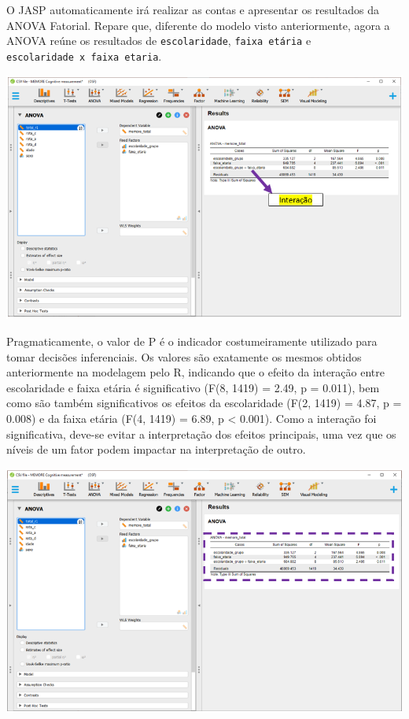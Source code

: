 \documentclass[
]{book}
\begin{document}
O JASP automaticamente irá realizar as contas e apresentar os resultados da ANOVA Fatorial. Repare que, diferente do modelo visto anteriormente, agora a ANOVA reúne os resultados de \texttt{escolaridade}, \texttt{faixa\ etária} e \texttt{escolaridade\ x\ faixa\ etaria}.

\includegraphics{./img/cap_anova_fatorial_resultados1.png}

Pragmaticamente, o valor de P é o indicador costumeiramente utilizado para tomar decisões inferenciais. Os valores são exatamente os mesmos obtidos anteriormente na modelagem pelo R, indicando que o efeito da interação entre escolaridade e faixa etária é significativo (F(8, 1419) = 2.49, p = 0.011), bem como são também significativos os efeitos da escolaridade (F(2, 1419) = 4.87, p = 0.008) e da faixa etária (F(4, 1419) = 6.89, p \textless{} 0.001). Como a interação foi significativa, deve-se evitar a interpretação dos efeitos principais, uma vez que os níveis de um fator podem impactar na interpretação de outro.

\includegraphics{./img/cap_anova_fatorial_resultados2.png}
\end{document}

